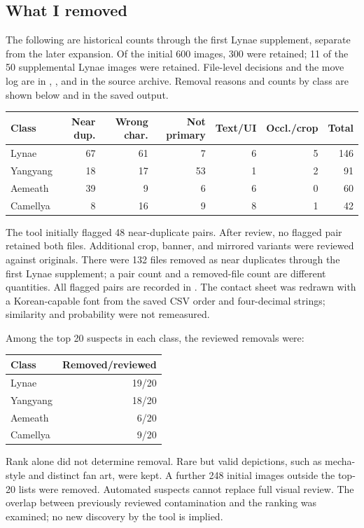 \documentclass[11pt]{article}
\begin{document}
\subsection*{What I removed}
The following are historical counts through the first Lynae supplement, separate from the later expansion. Of the initial 600 images, 300 were retained; 11 of the 50 supplemental Lynae images were retained. File-level decisions and the move log are in , , and  in the source archive.
Removal reasons and counts by class are shown below and in the saved output.
\begin{center}\small
\begin{tabular}{lrrrrrr}
\toprule Class & Near dup. & Wrong char. & Not primary & Text/UI & Occl./crop & Total \\
\midrule
Lynae & 67 & 61 & 7 & 6 & 5 & 146 \\
Yangyang & 18 & 17 & 53 & 1 & 2 & 91 \\
Aemeath & 39 & 9 & 6 & 6 & 0 & 60 \\
Camellya & 8 & 16 & 9 & 8 & 1 & 42 \\
\bottomrule
\end{tabular}\end{center}

The tool initially flagged 48 near-duplicate pairs. After review, no flagged pair retained both files. Additional crop, banner, and mirrored variants were reviewed against originals. There were 132 files removed as near duplicates through the first Lynae supplement; a pair count and a removed-file count are different quantities. All flagged pairs are recorded in . The contact sheet was redrawn with a Korean-capable font from the saved CSV order and four-decimal strings; similarity and probability were not remeasured.
\par\noindent {}\par

Among the top 20 suspects in each class, the reviewed removals were:
\begin{center}\begin{tabular}{lr}
\toprule Class & Removed/reviewed \\
\midrule

Lynae & 19/20 \\
Yangyang & 18/20 \\
Aemeath & 6/20 \\
Camellya & 9/20 \\
\bottomrule\end{tabular}\end{center}
Rank alone did not determine removal. Rare but valid depictions, such as mecha-style and distinct fan art, were kept. A further 248 initial images outside the top-20 lists were removed. Automated suspects cannot replace full visual review. The overlap between previously reviewed contamination and the ranking was examined; no new discovery by the tool is implied.
\end{document}
